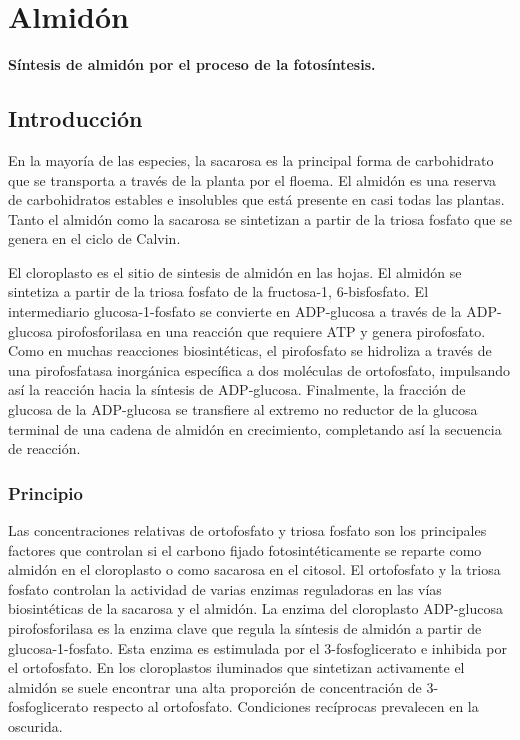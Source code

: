 \chapter[S\'intesis de almid\'on por el proceso de la fotos\'intesis]{Almid\'on}

\begin{Huge}
	\begin{center}
		\textbf{S\'intesis de almid\'on por el proceso de la fotos\'intesis.}
	\end{center}
\end{Huge}

\section{Introducci\'on}

En la mayor\'ia de las especies, la sacarosa es la principal forma de carbohidrato que se transporta a trav\'es de la planta por el floema. El almid\'on es una reserva de carbohidratos estables e insolubles que est\'a presente en casi todas las plantas. Tanto el almid\'on como la sacarosa se sintetizan a partir de la triosa fosfato que se genera en el ciclo de Calvin. 

El cloroplasto es el sitio de sintesis de almid\'on en las hojas. El almid\'on se sintetiza a partir de la triosa fosfato de la fructosa-1, 6-bisfosfato. El intermediario glucosa-1-fosfato se convierte en ADP-glucosa a través de la ADP-glucosa pirofosforilasa en una reacción que requiere ATP y genera pirofosfato. Como en muchas reacciones biosintéticas, el pirofosfato
se hidroliza a través de una pirofosfatasa inorgánica específica a dos mol\'eculas de ortofosfato, impulsando así la reacción hacia la síntesis de ADP-glucosa. Finalmente, la fracción de glucosa de la ADP-glucosa se transfiere al extremo no reductor de la glucosa terminal de una cadena de almidón en crecimiento, completando as\'i la secuencia de reacci\'on.

\subsection{Principio}

Las concentraciones relativas de ortofosfato y triosa fosfato son los principales factores que controlan si el carbono fijado fotosintéticamente se reparte como almidón en el cloroplasto o como sacarosa en el citosol. El ortofosfato y la triosa fosfato controlan la actividad de varias enzimas reguladoras en las vías biosintéticas de la sacarosa y el almidón. La enzima del cloroplasto ADP-glucosa pirofosforilasa es la enzima clave que regula la síntesis de almidón a partir de glucosa-1-fosfato. Esta enzima es estimulada por el 3-fosfoglicerato e inhibida por el ortofosfato. En los cloroplastos iluminados que sintetizan activamente el almidón se suele encontrar una alta proporción de concentración de 3-fosfoglicerato respecto al ortofosfato. Condiciones recíprocas prevalecen en la oscurida.

